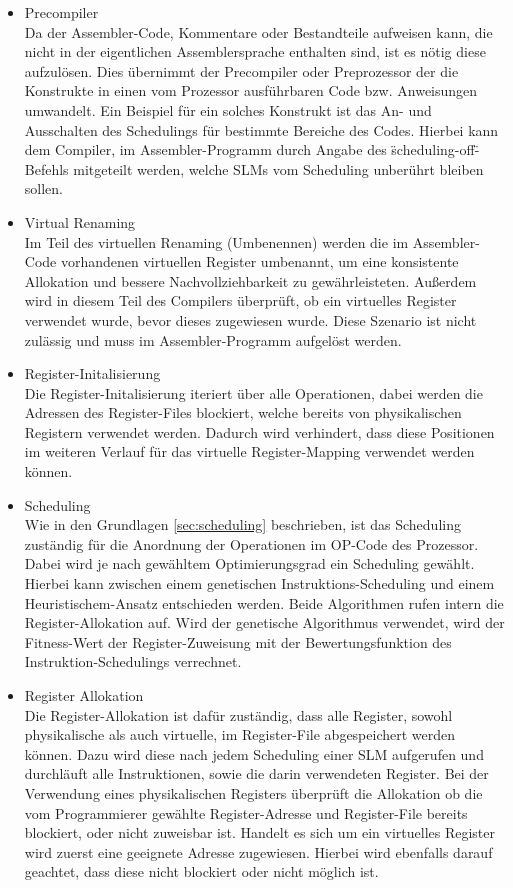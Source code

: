 \begin{itemize}
	\item Precompiler\\
		Da der Assembler-Code, Kommentare oder Bestandteile aufweisen kann, die nicht in der eigentlichen Assemblersprache enthalten sind, ist es nötig diese aufzulösen. Dies übernimmt der Precompiler oder Preprozessor der die Konstrukte in einen vom Prozessor ausführbaren Code bzw. Anweisungen umwandelt. Ein Beispiel für ein solches Konstrukt ist das An- und Ausschalten des Schedulings für bestimmte Bereiche des Codes. Hierbei kann dem Compiler, im Assembler-Programm durch Angabe des \"scheduling-off\"-Befehls mitgeteilt werden, welche SLMs vom Scheduling unberührt bleiben sollen.
	\item Virtual Renaming\\
		Im Teil des virtuellen Renaming (Umbenennen) werden die im Assembler-Code vorhandenen virtuellen Register umbenannt, um eine konsistente Allokation und bessere Nachvollziehbarkeit zu gewährleisteten. Außerdem wird in diesem Teil des Compilers überprüft, ob ein virtuelles Register verwendet wurde, bevor dieses zugewiesen wurde. Diese Szenario ist nicht zulässig und muss im Assembler-Programm aufgelöst werden.
	\item Register-Initalisierung\\
		Die Register-Initalisierung iteriert über alle Operationen, dabei werden die Adressen des Register-Files blockiert, welche bereits von physikalischen Registern verwendet werden. Dadurch wird verhindert, dass diese Positionen im weiteren Verlauf für das virtuelle Register-Mapping verwendet werden können.
	\item Scheduling\\
		Wie in den Grundlagen \ref{sec:scheduling} beschrieben, ist das Scheduling zuständig für die Anordnung der Operationen im OP-Code des Prozessor. Dabei wird je nach gewähltem Optimierungsgrad ein Scheduling gewählt. Hierbei kann zwischen einem genetischen Instruktions-Scheduling und einem Heuristischem-Ansatz entschieden werden. Beide Algorithmen rufen intern die Register-Allokation auf. Wird der genetische Algorithmus verwendet, wird der Fitness-Wert der Register-Zuweisung mit der Bewertungsfunktion des Instruktion-Schedulings verrechnet.
	\item Register Allokation\\
		Die Register-Allokation ist dafür zuständig, dass alle Register, sowohl physikalische als auch virtuelle, im Register-File abgespeichert werden können. Dazu wird diese nach jedem Scheduling einer SLM aufgerufen und durchläuft alle Instruktionen, sowie die darin verwendeten Register. Bei der Verwendung eines physikalischen Registers überprüft die Allokation ob die vom Programmierer gewählte Register-Adresse und Register-File bereits blockiert, oder nicht zuweisbar ist. Handelt es sich um ein virtuelles Register wird zuerst eine geeignete Adresse zugewiesen. Hierbei wird ebenfalls darauf geachtet, dass diese nicht blockiert oder nicht möglich ist.

\end{itemize}
